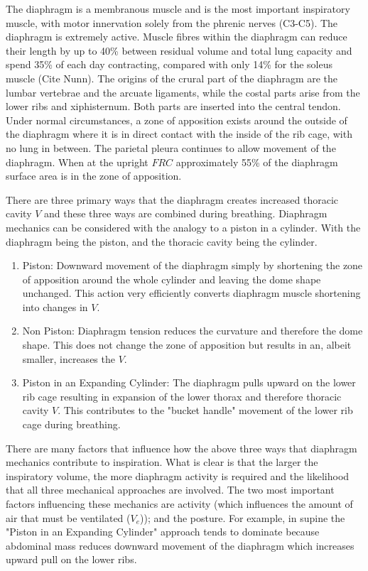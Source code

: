The diaphragm is a membranous muscle and is the most important inspiratory muscle, with motor innervation solely from the phrenic nerves (C3-C5). The diaphragm is extremely active. Muscle fibres within the diaphragm can reduce their length by up to 40\% between residual volume and total lung capacity and spend 35\% of each day contracting, compared with only 14\% for the soleus muscle (Cite Nunn). The origins of the crural part of the diaphragm are the lumbar vertebrae and the arcuate ligaments, while the costal parts arise from the lower ribs and xiphisternum. Both parts are inserted into the central tendon. 
Under normal circumstances, a zone of apposition exists around the outside of the diaphragm where it is in direct contact with the inside of the rib cage, with no lung in between. The parietal pleura continues to allow movement of the diaphragm. When at the upright $FRC$ approximately 55\% of the diaphragm surface area is in the zone of apposition.

There are three primary ways that the diaphragm creates increased thoracic cavity $V$ and these three ways are combined during breathing. Diaphragm mechanics can be considered with the analogy to a piston in a cylinder. With the diaphragm being the piston, and the thoracic cavity being the cylinder. 

\begin{enumerate}
    \item Piston: Downward movement of the diaphragm simply by shortening the zone of apposition around the whole cylinder and leaving the dome shape unchanged. This action very efficiently converts diaphragm muscle shortening into changes in $V$.
    \item Non Piston: Diaphragm tension reduces the curvature and therefore the dome shape. This does not change the zone of apposition but results in an, albeit smaller, increases the $V$.
    \item Piston in an Expanding Cylinder: The diaphragm pulls upward on the lower rib cage resulting in expansion of the lower thorax and therefore thoracic cavity $V$. This contributes to the "bucket handle" movement of the lower rib cage during breathing.
\end{enumerate}

There are many factors that influence how the above three ways that diaphragm mechanics contribute to inspiration. What is clear is that the larger the inspiratory volume, the more diaphragm activity is required and the likelihood that all three mechanical approaches are involved. The two most important factors influencing these mechanics are activity (which influences the amount of air that must be ventilated ($V_e$)); and the posture. For example, in supine the "Piston in an Expanding Cylinder" approach tends to dominate because abdominal mass reduces downward movement of the diaphragm which increases upward pull on the lower ribs.


